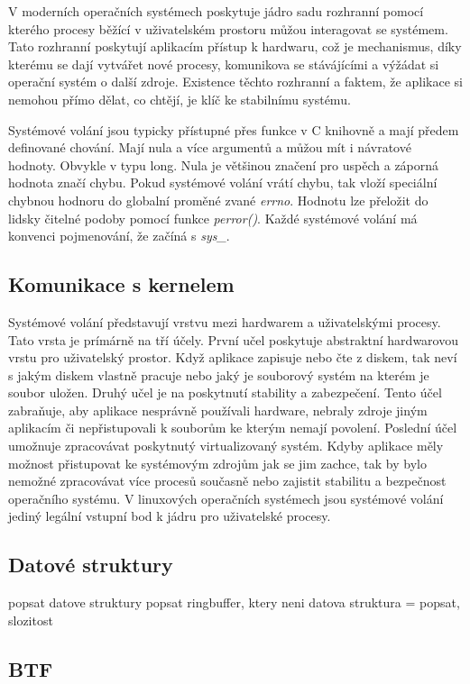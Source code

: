 V moderních operačních systémech poskytuje jádro sadu rozhranní pomocí kterého procesy běžící v uživatelském prostoru můžou interagovat
se systémem. Tato rozhranní poskytují aplikacím přístup k hardwaru, což je mechanismus, díky kterému se dají vytvářet nové procesy,
komunikova se stávájícími a výžádat si operační systém o další zdroje. Existence těchto rozhranní a faktem, že aplikace si nemohou přímo
dělat, co chtějí, je klíč ke stabilnímu systému.

Systémové volání\cite{LinuxKernelDevelopment} jsou typicky přístupné přes funkce v C knihovně a mají předem definované chování. Mají nula
a více argumentů a můžou mít i návratové hodnoty. Obvykle v typu long. Nula je většinou značení pro uspěch a záporná hodnota značí chybu.
Pokud systémové volání vrátí chybu, tak vloží speciální chybnou hodnoru do globalní proměné zvané \emph{errno}. Hodnotu lze přeložit do
lidsky čitelné podoby pomocí funkce \emph{perror()}. Každé systémové volání má konvenci pojmenování, že začíná s \emph{sys_}.

\subsection*{Komunikace s kernelem}

Systémové volání představují vrstvu mezi hardwarem a uživatelskými procesy. Tato vrsta je prímárně na tří účely. První učel poskytuje
abstraktní hardwarovou vrstu pro uživatelský prostor. Když aplikace zapisuje nebo čte z diskem, tak neví s jakým diskem vlastně pracuje
nebo jaký je souborový systém na kterém je soubor uložen. Druhý učel je na poskytnutí stability a zabezpečení. Tento účel zabraňuje, aby
aplikace nesprávně používali hardware, nebraly zdroje jiným aplikacím či nepřistupovali k souborům ke kterým nemají povolení. Poslední
účel umožnuje zpracovávat poskytnutý virtualizovaný systém. Kdyby aplikace měly možnost přistupovat ke systémovým zdrojům jak se jim zachce,
tak by bylo nemožné zpracovávat více procesů současně nebo zajistit stabilitu a bezpečnost operačního systému. V linuxových operačních
systémech jsou systémové volání jediný legální vstupní bod k jádru pro uživatelské procesy.

\subsection{Datové struktury}
popsat datove struktury
popsat ringbuffer, ktery neni datova struktura = popsat, slozitost

\subsection{BTF}

